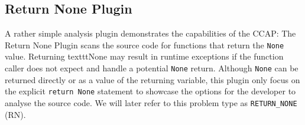 \subsection{Return None Plugin}\label{sec:return_none_ccap_implementation}
A rather simple analysis plugin demonstrates the capabilities of the CCAP: The Return None Plugin scans the source code for functions that return the \texttt{None} value. Returning texttt{None} may result in runtime exceptions if the function caller does not expect and handle a potential \texttt{None} return. Although \texttt{None} can be returned directly or as a value of the returning variable, this plugin only focus on the explicit \texttt{return None} statement to showcase the options for the developer to analyse the source code. We will later refer to this problem type as \texttt{RETURN\_NONE} (RN).

